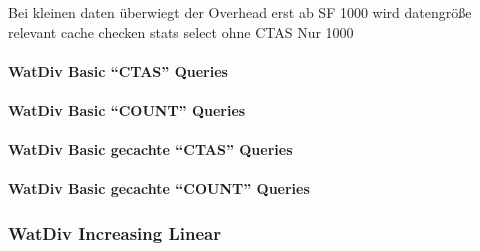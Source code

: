 \documentclass[
  a4paper,
  twocolumn
]{scrartcl}
\begin{document}
Bei kleinen daten überwiegt der Overhead		
erst ab SF 1000 wird datengröße relevant		
cache checken stats		
select ohne CTAS		Nur 1000

\lipsum[1-2]

\paragraph{WatDiv Basic \enquote{CTAS} Queries}

\lipsum[1-2]

\paragraph{WatDiv Basic \enquote{COUNT} Queries}

\lipsum[1-2]

\paragraph{WatDiv Basic gecachte \enquote{CTAS} Queries}

\lipsum[1-2]

\paragraph{WatDiv Basic gecachte \enquote{COUNT} Queries}

\lipsum[1-2]
\lipsum[1-2]

\subsubsection{WatDiv Increasing Linear}

\lipsum[1-2]
\lipsum[1-2]
\end{document}
